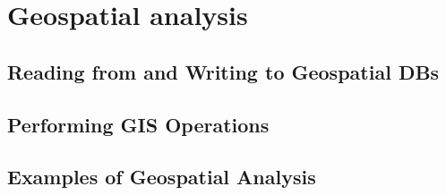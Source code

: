 
\chapter{Geospatial analysis}\label{sec:GeospatialAnalysis}



\section{Reading from and Writing to Geospatial DBs}\label{sec:ReadWriteGISDB}
%

\section{Performing GIS Operations}\label{sec:GISOperations}

\section{Examples of Geospatial Analysis}


